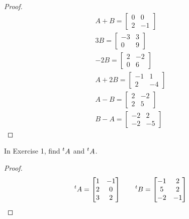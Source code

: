 \begin{proof}
    \[
        \begin{split}
            A + B = \begin{bmatrix}
                0 & 0  \\
                2 & -1
            \end{bmatrix} \\
            3B = \begin{bmatrix}
                -3 & 3 \\
                0  & 9
            \end{bmatrix} \\
            -2B = \begin{bmatrix}
                2 & -2 \\
                0 & 6
            \end{bmatrix} \\
            A + 2B = \begin{bmatrix}
                -1 & 1  \\
                2  & -4
            \end{bmatrix} \\
            A - B = \begin{bmatrix}
                2 & -2 \\
                2 & 5
            \end{bmatrix} \\
            B - A = \begin{bmatrix}
                -2 & 2  \\
                -2 & -5
            \end{bmatrix}
        \end{split}
    \]
\end{proof}

\begin{exercise}
    In Exercise 1, find $\prescript{t}{}{A}$ and $\prescript{t}{}{A}$.
\end{exercise}

\begin{proof}
    \[
        \prescript{t}{}{A} = \begin{bmatrix}
            1 & -1 \\
            2 & 0  \\
            3 & 2
        \end{bmatrix}
        \qquad
        \prescript{t}{}{B} = \begin{bmatrix}
            -1 & 2  \\
            5  & 2  \\
            -2 & -1
        \end{bmatrix}
    \]
\end{proof}

